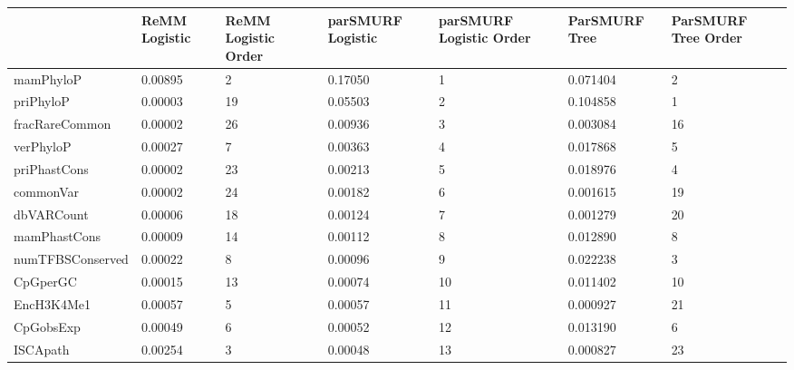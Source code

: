 \begin{tabular}{lll}
\toprule
{} &  ReMM Logistic &  ReMM Logistic Order &  parSMURF Logistic &  parSMURF Logistic Order &  ParSMURF Tree &  ParSMURF Tree Order \\
\midrule
mamPhyloP           &        0.00895 &                    2 &            0.17050 &                        1 &       0.071404 &                    2 \\
priPhyloP           &        0.00003 &                   19 &            0.05503 &                        2 &       0.104858 &                    1 \\
fracRareCommon      &        0.00002 &                   26 &            0.00936 &                        3 &       0.003084 &                   16 \\
verPhyloP           &        0.00027 &                    7 &            0.00363 &                        4 &       0.017868 &                    5 \\
priPhastCons        &        0.00002 &                   23 &            0.00213 &                        5 &       0.018976 &                    4 \\
commonVar           &        0.00002 &                   24 &            0.00182 &                        6 &       0.001615 &                   19 \\
dbVARCount          &        0.00006 &                   18 &            0.00124 &                        7 &       0.001279 &                   20 \\
mamPhastCons        &        0.00009 &                   14 &            0.00112 &                        8 &       0.012890 &                    8 \\
numTFBSConserved    &        0.00022 &                    8 &            0.00096 &                        9 &       0.022238 &                    3 \\
CpGperGC            &        0.00015 &                   13 &            0.00074 &                       10 &       0.011402 &                   10 \\
EncH3K4Me1          &        0.00057 &                    5 &            0.00057 &                       11 &       0.000927 &                   21 \\
CpGobsExp           &        0.00049 &                    6 &            0.00052 &                       12 &       0.013190 &                    6 \\
ISCApath            &        0.00254 &                    3 &            0.00048 &                       13 &       0.000827 &                   23 \\

\end{tabular}
